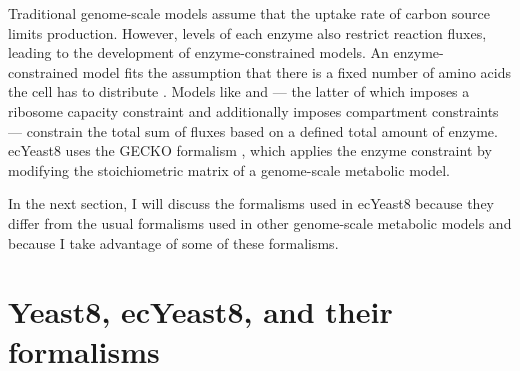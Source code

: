 Traditional genome-scale models assume that the uptake rate of carbon source limits production.
However, levels of each enzyme also restrict reaction fluxes, leading to the development of enzyme-constrained models.
An enzyme-constrained model fits the assumption that there is a fixed number of amino acids the cell has to distribute \parencite{weisseMechanisticLinksCellular2015}.
Models like \textcite{sanchezImprovingPhenotypePredictions2017} and \textcite{elsemmanWholecellModelingYeast2022} --- the latter of which imposes a ribosome capacity constraint and additionally imposes compartment constraints --- constrain the total sum of fluxes based on a defined total amount of enzyme.
ecYeast8 uses the GECKO formalism \parencite{sanchezImprovingPhenotypePredictions2017}, which applies the enzyme constraint by modifying the stoichiometric matrix of a genome-scale metabolic model.

In the next section, I will discuss the formalisms used in ecYeast8 because they differ from the usual formalisms used in other genome-scale metabolic models and because I take advantage of some of these formalisms.

\section{Yeast8, ecYeast8, and their formalisms}
\label{sec:model-yeast8}

